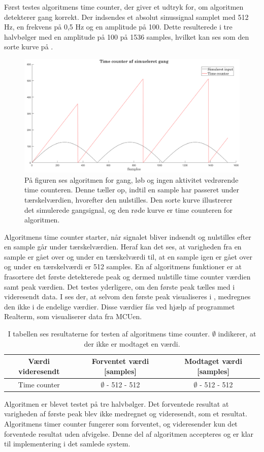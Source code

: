 Først testes algoritmens time counter, der giver et udtryk for, om algoritmen detekterer gang korrekt. Der indsendes et absolut sinussignal samplet med 512 Hz, en frekvens på 0,5 Hz og en amplitude på 100. Dette resulterede i tre halvbølger med en amplitude på 100 på 1536 samples, hvilket kan ses som den sorte kurve på .
\begin{figure}[H]
	\centering
	\includegraphics[width=.7\textwidth]{figures/cDesign/test_timecount_gang.png}
	\caption{På figuren ses algoritmen for gang, løb og ingen aktivitet vedrørende time counteren. Denne tæller op, indtil en sample har passeret under tærskelværdien, hvorefter den nulstilles. Den sorte kurve illustrerer det simulerede gangsignal, og den røde kurve er time counteren for algoritmen.}
	\label{fig:testgraf_timecounter}
\end{figure}\vspace{-0.25cm}
Algoritmens time counter starter, når signalet bliver indsendt og nulstilles efter en sample går under tærskelværdien. Heraf kan det ses, at varigheden fra en sample er gået over og under en tærskelværdi til, at en sample igen er gået over og under en tærskelværdi er 512 samples. En af algoritmens funktioner er at frasortere det første detekterede peak og dermed nulstille time counter værdien samt peak værdien. Det testes yderligere, om den første peak tælles med i videresendt data. I  ses der, at selvom den første peak visualiseres i , medregnes den ikke i de endelige værdier. Disse værdier fås ved hjælp af programmet Realterm, som visualiserer data fra MCUen.
\begin{table}[H]
	\centering
	\begin{tabular}{ccc}
		\hline
		\rowcolor[HTML]{C0C0C0} 
		Værdi videresendt & Forventet værdi [samples] & Modtaget værdi [samples] \\ \hline
		Time counter & $\emptyset$ - 512 - 512 & $\emptyset$ - 512 - 512 \\ \hline
	\end{tabular}
	\caption{I tabellen ses resultaterne for testen af algoritmens time counter. $\emptyset$ indikerer, at der ikke er modtaget en værdi.}
	\label{tab:test_res_timecount}
\end{table}\vspace{-0.25cm}
Algoritmen er blevet testet på tre halvbølger. Det forventede resultat at varigheden af første peak blev ikke medregnet og videresendt, som et resultat. Algoritmens timer counter fungerer som forventet, og videresender kun det forventede resultat uden afvigelse. Denne del af algoritmen accepteres og er klar til implementering i det samlede system.

